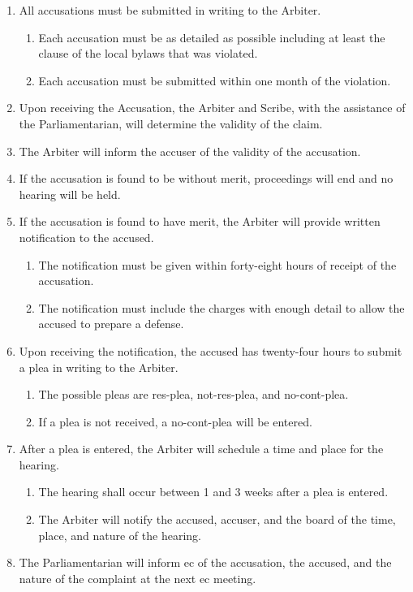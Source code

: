 	\begin{enumerate}
		\item All accusations must be submitted in writing to the Arbiter.
			\begin{enumerate}
				\item Each accusation must be as detailed as possible including at least the clause of the local bylaws that was violated.
				\item Each accusation must be submitted within one month of the violation.
			\end{enumerate}

		\item Upon receiving the Accusation, the Arbiter and Scribe, with the assistance of the Parliamentarian, will determine the validity of the claim.
		\item The Arbiter will inform the accuser of the validity of the accusation.
		\item If the accusation is found to be without merit, proceedings will end and no hearing will be held.
		\item If the accusation is found to have merit, the Arbiter will provide written notification to the accused.
			\begin{enumerate}
				\item The notification must be given within forty-eight hours of receipt of the accusation.
				\item The notification must include the charges with enough detail to allow the accused to prepare a defense.
			\end{enumerate}
		\item Upon receiving the notification, the accused has twenty-four hours to submit a plea in writing to the Arbiter.
			\begin{enumerate}
				\item The possible pleas are \gls{res-plea}, \gls{not-res-plea}, and \gls{no-cont-plea}.
				\item If a plea is not received, a \gls{no-cont-plea} will be entered.
			\end{enumerate}

		\item After a plea is entered, the Arbiter will schedule a time and place for the hearing.
			\begin{enumerate}
				\item The hearing shall occur between 1 and 3 weeks after a plea is entered.
				\item The Arbiter will notify the accused, accuser, and the board of the time, place, and nature of the hearing.
			\end{enumerate}

		\item The Parliamentarian will inform \gls{ec} of the accusation, the accused, and the nature of the complaint at the next \gls{ec} meeting.

	\end{enumerate}

